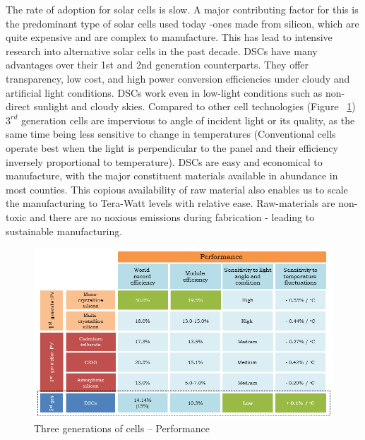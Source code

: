   The rate of adoption for solar cells is slow. A major contributing factor for this is the predominant type of solar cells used today -ones made from silicon, which are quite expensive and are complex to manufacture. This has lead to intensive research into alternative solar cells in the past decade. \ac{DSCs} have many advantages over their 1st and 2nd generation counterparts. They offer transparency, low cost, and high power conversion efficiencies under cloudy and artificial light conditions. \ac{DSCs} work even in low-light conditions such as non-direct sunlight and cloudy skies. Compared to other cell technologies (Figure ~\ref{fig:3rd_gen}) $3^{rd}$ generation cells are impervious to angle of incident light or its quality, as the same time being less sensitive to change in temperatures (Conventional cells operate best when the light is perpendicular to the panel and their efficiency inversely proportional to temperature). \ac{DSCs} are easy and economical to manufacture, with the major constituent materials available in abundance in most counties. This copious availability of raw material also enables us to scale the manufacturing to Tera-Watt levels with relative ease. Raw-materials are non-toxic and there are no noxious emissions during fabrication - leading to sustainable manufacturing.\\
  
   
  \begin{figure}[H]
  \begin{center}
  \includegraphics[width=\textwidth]{images/3rd_gen}
  \caption{ Three generations of cells –  Performance}
  \label{fig:3rd_gen}
  \end{center}
  \end{figure}
 
 
